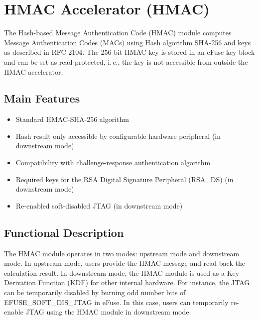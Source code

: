 \documentclass[main\_\_EN.tex]{subfiles}
\begin{document}

\ifglobal
\else
    {\let\clearpage\relax \listoftodos}
    \tableofcontents
\fi



\chapter{HMAC Accelerator (HMAC)}
\label{mod:hmac}
\hypertarget{hmac}{}

The Hash-based Message Authentication Code (HMAC) module computes Message Authentication Codes (MACs) using Hash algorithm SHA-256 and keys as described in RFC 2104. The 256-bit HMAC key is stored in an eFuse key block and can be set as read-protected, i.\,e., the key is not accessible from outside the HMAC accelerator.

\section{Main Features}
\begin{itemize}
    \item Standard HMAC-SHA-256 algorithm
    \item Hash result only accessible by configurable hardware peripheral (in downstream mode)
    \item Compatibility with challenge-response authentication algorithm
    \item Required keys for the RSA Digital Signature Peripheral (RSA\_DS) (in downstream mode)
    \item Re-enabled soft-disabled JTAG (in downstream mode)
\end{itemize}


\section{Functional Description}
The HMAC module operates in two modes: upstream mode and downstream mode. In upstream mode, users provide the HMAC message and read back the calculation result. In downstream mode, the HMAC module is used as a Key Derivation Function (KDF) for other internal hardware. For instance, the JTAG can be temporarily disabled by burning odd number bits of EFUSE\_SOFT\_DIS\_JTAG in eFuse. In this case, users can temporarily re-enable JTAG using the HMAC module in downstream mode.
\end{document}
